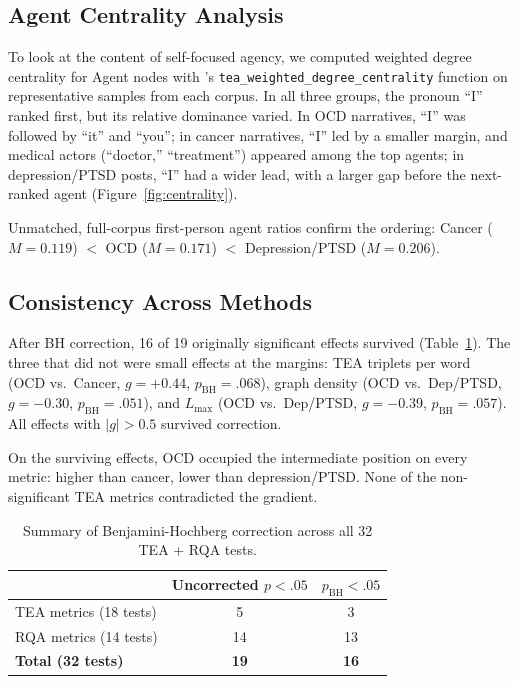 \documentclass[11pt,a4paper]{article}
\begin{document}
\subsection{Agent Centrality Analysis}

To look at the content of self-focused agency, we computed weighted degree centrality for Agent nodes with \citeauthor{franchini2026tea}'s \texttt{tea\_weighted\_degree\_centrality} function on representative samples from each corpus. In all three groups, the pronoun ``I'' ranked first, but its relative dominance varied. In OCD narratives, ``I'' was followed by ``it'' and ``you''; in cancer narratives, ``I'' led by a smaller margin, and medical actors (``doctor,'' ``treatment'') appeared among the top agents; in depression/PTSD posts, ``I'' had a wider lead, with a larger gap before the next-ranked agent (Figure~\ref{fig:centrality}).

Unmatched, full-corpus first-person agent ratios confirm the ordering: Cancer ($M = 0.119$) $<$ OCD ($M = 0.171$) $<$ Depression/PTSD ($M = 0.206$).

\subsection{Consistency Across Methods}

After BH correction, 16 of 19 originally significant effects survived (Table~\ref{tab:bh_summary}). The three that did not were small effects at the margins: TEA triplets per word (OCD vs.\ Cancer, $g = +0.44$, $p_\mathrm{BH} = .068$), graph density (OCD vs.\ Dep/PTSD, $g = -0.30$, $p_\mathrm{BH} = .051$), and $L_\mathrm{max}$ (OCD vs.\ Dep/PTSD, $g = -0.39$, $p_\mathrm{BH} = .057$). All effects with $|g| > 0.5$ survived correction.

On the surviving effects, OCD occupied the intermediate position on every metric: higher than cancer, lower than depression/PTSD. None of the non-significant TEA metrics contradicted the gradient.

\begin{table}[t]
\centering
\caption{Summary of Benjamini-Hochberg correction across all 32 TEA + RQA tests.}
\label{tab:bh_summary}
\small
\begin{tabular}{@{}lcc@{}}
\toprule
 & Uncorrected $p < .05$ & $p_\mathrm{BH} < .05$ \\
\midrule
TEA metrics (18 tests) & 5 & 3 \\
RQA metrics (14 tests) & 14 & 13 \\
\midrule
\textbf{Total (32 tests)} & \textbf{19} & \textbf{16} \\
\bottomrule
\end{tabular}
\end{table}
\end{document}
